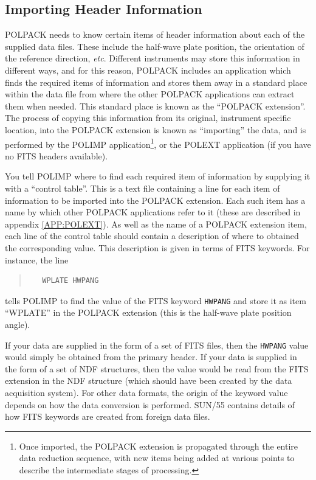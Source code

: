 \documentclass[twoside,11pt]{article}
\newcommand{\hyperref}[4]{#2\ref{#4}#3}
\newcommand{\htmlref}[2]{#1}
\newcommand{\xref}[3]{#1}
\renewcommand{\_}{\texttt{\symbol{95}}}
\newenvironment{myquote}{\begin{quote}\begin{small}}{\end{small}\end{quote}}
\begin{document}
\subsection{\label{SEC:IMPORT}Importing Header Information}
POLPACK needs to know certain items of header information about each of
the supplied data files. These include the half-wave plate position, the
orientation of the reference direction, \emph{etc}. Different instruments may
store this information in different ways, and for this reason, POLPACK
includes an application which finds the required items of information and
stores them away in a standard place within the data file from where the
other POLPACK applications can extract them when needed. This standard
place is known as the ``POLPACK extension''. The process of copying this
information from its original, instrument specific location, into the
POLPACK extension is known as ``importing'' the data, and is performed by
the \htmlref{POLIMP}{POLIMP} application\footnote{Once imported, the POLPACK
extension is propagated through the entire data reduction sequence, with
new items being added at various points to describe the intermediate
stages of processing.}, or the \htmlref{POLEXT}{POLEXT} application (if
you have no FITS headers available).

You tell POLIMP where to find each required item of information by
supplying it with a ``control table''. This is a text file containing a
line for each item of information to be imported into the POLPACK
extension. Each such item has a name by which other POLPACK applications
refer to it (these are described \hyperref{here}{in
appendix }{}{APP:POLEXT}). As well as the name of a POLPACK extension
item, each line of the control table should contain a description of where to
obtained the corresponding value. This description is given in terms of
FITS keywords. For instance, the line

\begin{myquote}
\begin{verbatim}
   WPLATE HWPANG
\end{verbatim}
\end{myquote}

tells POLIMP to find the value of the FITS keyword \verb+HWPANG+ and
store it as item ``WPLATE'' in the POLPACK extension (this is the
half-wave plate position angle).

If your data are supplied in the form of a set of FITS files, then the
\verb+HWPANG+ value would simply be obtained from the primary header. If your
data is supplied in the form of a set of NDF structures, then the value
would be read from the FITS extension in the NDF structure (which should
have been created by the data acquisition system). For other data formats,
the origin of the keyword value depends on how the data conversion is
performed. \xref{SUN/55}{sun55}{} contains details of how FITS keywords
are created from foreign data files.
\end{document}
